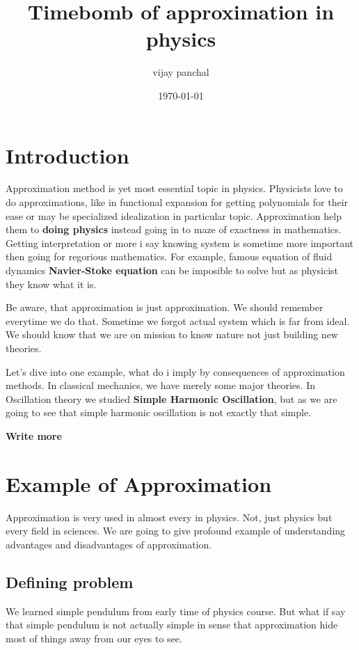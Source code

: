 \documentclass[11pt,a4paper]{article}
\author{vijay panchal}
\date{\today}
\title{Timebomb of approximation in physics}
\begin{document}
\maketitle
\tableofcontents



\section{Introduction}
\label{sec:org7144f46}

Approximation method is yet most essential topic in physics. Physicists love to do approximations, like in functional expansion for getting polynomials for their ease or may be specialized idealization in particular topic. Approximation help them to \textbf{doing physics} instead going in to maze of exactness in mathematics. Getting interpretation or more i say knowing system is sometime more important then going for regorious mathematics. For example, famous equation of fluid dynamics \textbf{Navier-Stoke equation} can be imposible to solve but as physicist they know what it is.

Be aware, that approximation is just approximation. We should remember everytime we do that. Sometime we forgot actual system which is far from ideal. We should know that we are on mission to know nature not just building new theories.

Let's dive into one example, what do i imply by consequences of approximation methods. In classical mechanics, we have merely some major theories. In Oscillation theory we studied \textbf{Simple Harmonic Oscillation}, but as we are going to see that simple harmonic oscillation is not exactly that simple. 

\textbf{Write more}

\section{Example of Approximation}
\label{sec:orgbb8d41a}

Approximation is very used in almost every in physics. Not, just physics but every field in sciences. We are going to give profound example of understanding advantages and disadvantages of approximation.

\subsection{Defining problem}
\label{sec:orgeeb96a9}

We learned simple pendulum from early time of physics course. But what if say that simple pendulum is not actually simple in sense that approximation hide most of things away from our eyes to see.
\end{document}
